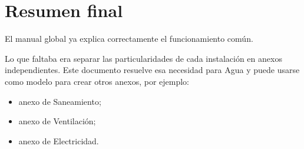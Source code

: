 \documentclass[12pt,a4paper]{article}
\begin{document}
\section{Resumen final}

El manual global ya explica correctamente el funcionamiento común.

Lo que faltaba era separar las particularidades de cada instalación en anexos independientes. Este documento resuelve esa necesidad para Agua y puede usarse como modelo para crear otros anexos, por ejemplo:

\begin{itemize}
\item anexo de Saneamiento;
\item anexo de Ventilación;
\item anexo de Electricidad.
\end{itemize}
\end{document}
